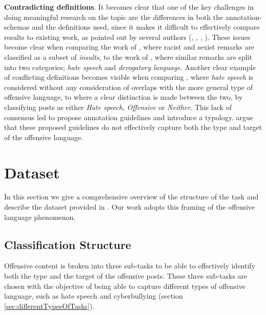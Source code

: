 \documentclass{article}
\begin{document}
\textbf{Contradicting definitions}. It becomes clear that one of the key challenges in doing meaningful research on the topic are the differences in both the annotation-schemas and the definitions used, since it makes it difficult to effectively compare results to existing work, as pointed out by several authors (\cite{abusiveLanguageDetectionInOnlineUserContent}, \cite{schmidt2017survey}, \cite{understandinAbuse}, \cite{zampieri2019predicting}). These issues become clear when comparing the work of \cite{guidelinesCyberbullying}, where racist and sexist remarks are classified as a subset of \textit{insults}, to the work of \cite{nobata2016abusive}, where similar remarks are split into two categories; \textit{hate speech} and \textit{derogatory language}. Another clear example of conflicting definitions becomes visible when comparing \cite{waseem2016hateful}, where \textit{hate speech} is considered without any consideration of overlaps with the more general type of offensive language, to \cite{davidson2017automated} where a clear distinction is made between the two, by classifying posts as either \textit{Hate speech}, \textit{Offensive} or \textit{Neither}. This lack of consensus led \cite{understandinAbuse} to propose annotation guidelines and introduce a typology.  \cite{zampieri2019semeval} argue that these proposed guidelines do not effectively capture both the type and target of the offensive language. 

\section{Dataset}
\label{sec:dataset}

In this section we give a comprehensive overview of the structure of the task and describe the dataset provided in \cite{zampieri2019predicting}. Our work adopts this framing of the offensive language phenomenon.

\subsection{Classification Structure}\label{sec:classificationStructure}

Offensive content is broken into three sub-tasks to be able to effectively identify both the type and the target of the offensive posts. These three sub-tasks are chosen with the objective of being able to capture different types of offensive language, such as hate speech and cyberbullying (section \ref{sec:differentTypesOfTasks}). 
\end{document}
